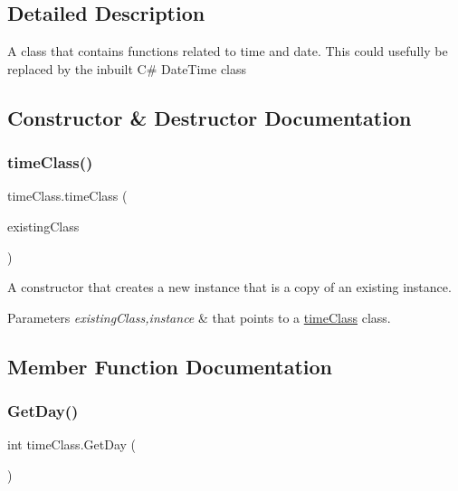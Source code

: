 \subsection{Detailed Description}
A class that contains functions related to time and date. This could usefully be replaced by the inbuilt C\# Date\+Time class 

\subsection{Constructor \& Destructor Documentation}
\mbox{\label{classtime_class_a2e9663011afb5016b7d5f19a0f3e620c}} 
\subsubsection{\texorpdfstring{timeClass()}{timeClass()}}
{\footnotesize\ttfamily time\+Class.\+time\+Class (\begin{DoxyParamCaption}\item[{\mbox{\hyperlink{classtime_class}{time\+Class}}}]{existing\+Class }\end{DoxyParamCaption})\hspace{0.3cm}{\ttfamily [inline]}}



A constructor that creates a new instance that is a copy of an existing instance. 


\begin{DoxyParams}{Parameters}
{\em existing\+Class,instance} & that points to a \mbox{\hyperlink{classtime_class}{time\+Class}} class. \\
\hline
\end{DoxyParams}


\subsection{Member Function Documentation}
\mbox{\label{classtime_class_aa593aee7c9ef8d70716e1f9fb3206545}} 
\subsubsection{\texorpdfstring{GetDay()}{GetDay()}}
{\footnotesize\ttfamily int time\+Class.\+Get\+Day (\begin{DoxyParamCaption}{ }\end{DoxyParamCaption})\hspace{0.3cm}{\ttfamily [inline]}}



